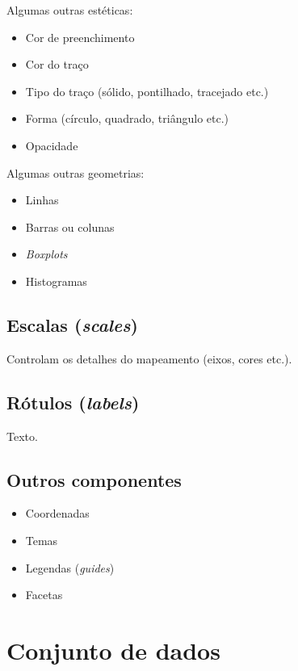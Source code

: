 \documentclass[
  12pt]{report}
\providecommand{\tightlist}{%
  \setlength{\itemsep}{0pt}\setlength{\parskip}{0pt}}
\begin{document}
Algumas outras estéticas:

\begin{itemize}
\tightlist
\item
  Cor de preenchimento
\item
  Cor do traço
\item
  Tipo do traço (sólido, pontilhado, tracejado etc.)
\item
  Forma (círculo, quadrado, triângulo etc.)
\item
  Opacidade
\end{itemize}

Algumas outras geometrias:

\begin{itemize}
\tightlist
\item
  Linhas
\item
  Barras ou colunas
\item
  \emph{Boxplots}
\item
  Histogramas
\end{itemize}

\hypertarget{escalas-scales}{%
\subsection{\texorpdfstring{Escalas (\emph{scales})}{Escalas (scales)}}\label{escalas-scales}}

Controlam os detalhes do mapeamento (eixos, cores etc.).

\hypertarget{ruxf3tulos-labels}{%
\subsection{\texorpdfstring{Rótulos (\emph{labels})}{Rótulos (labels)}}\label{ruxf3tulos-labels}}

Texto.

\hypertarget{outros-componentes}{%
\subsection{Outros componentes}\label{outros-componentes}}

\begin{itemize}
\tightlist
\item
  Coordenadas
\item
  Temas
\item
  Legendas (\emph{guides})
\item
  Facetas
\end{itemize}

\hypertarget{conjunto-de-dados}{%
\section{Conjunto de dados}\label{conjunto-de-dados}}
\end{document}
